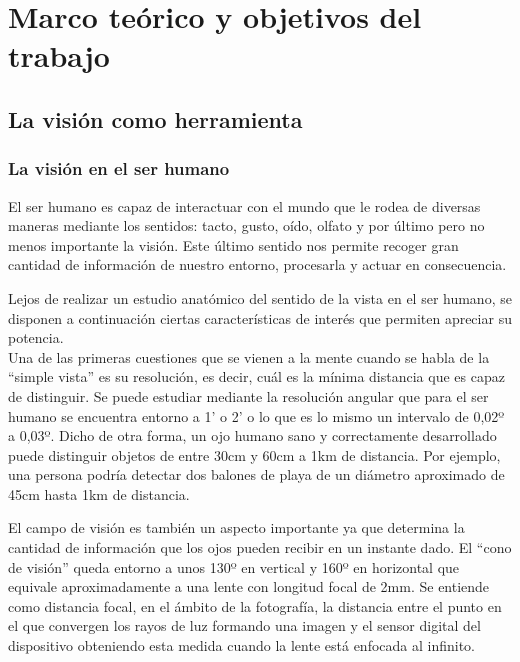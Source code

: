 \chapter{Marco teórico y objetivos del trabajo}
\iffalse
\begin{chapquote}{Autor, \textit{tiempo}}
`` cita''
\end{chapquote}
\fi

\iffalse
\section{La visión como herramienta}
\subsection{La visión en el ser humano}
El ser humano es capaz de interactuar con el mundo que le rodea de diversas maneras mediante los sentidos: tacto, gusto, oído, olfato y por último pero no menos importante la visión. Este último sentido nos permite recoger gran cantidad de información de nuestro entorno, procesarla y actuar en consecuencia. 

Lejos de realizar un estudio anatómico del sentido de la vista en el ser humano, se disponen a continuación ciertas características de interés que permiten apreciar su potencia.
\\
Una de las primeras cuestiones que se vienen a la mente cuando se habla de la ``simple vista'' es su resolución, es decir, cuál es la mínima distancia que es capaz de distinguir. Se puede estudiar mediante la resolución angular que para el ser humano se encuentra entorno a 1' o 2' o lo que es lo mismo un intervalo de 0,02º a 0,03º\cite{simple_vista}. Dicho de otra forma, un ojo humano sano y correctamente desarrollado puede distinguir objetos de entre 30cm y 60cm a 1km de distancia. Por ejemplo, una persona podría detectar dos balones de playa de un diámetro aproximado de 45cm hasta 1km de distancia.


El campo de visión es también un aspecto importante ya que determina la cantidad de información que los ojos pueden recibir en un instante dado. El ``cono de visión'' queda entorno a unos 130º en vertical y 160º en horizontal que equivale aproximadamente a una lente con longitud focal de 2mm\cite{angle_of_view}. Se entiende como distancia focal, en el ámbito de la fotografía, la distancia entre el punto en el que convergen los rayos de luz formando una imagen y el sensor digital del dispositivo obteniendo esta medida cuando la lente está enfocada al infinito.

